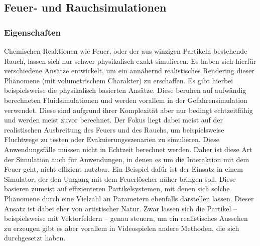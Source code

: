\subsection{Feuer- und Rauchsimulationen}

\subsubsection{Eigenschaften}
Chemischen Reaktionen wie Feuer, oder der aus winzigen Partikeln bestehende Rauch,
lassen sich nur schwer physikalisch exakt simulieren. Es haben sich hierfür verschiedene Ansätze entwickelt, um ein
annähernd realistisches Rendering dieser Phänomene (mit volumetrischem Charakter) zu erschaffen. 
Es gibt hierbei beispielsweise die physikalisch basierten Ansätze. 
Diese beruhen auf aufwändig berechneten Fluidsimulationen und werden vorallem in der Gefahrensimulation verwendet.
Diese sind aufgrund ihrer Komplexität aber nur bedingt echtzeitfähig und werden meist zuvor berechnet. 
Der Fokus liegt dabei meist auf der realistischen Ausbreitung des Feuers und des Rauchs, um beispielsweise Fluchtwege 
zu testen oder Evakuierungsszenarien zu simulieren. Diese Anwendungsfälle müssen nicht in Echtzeit berechnet werden.
Daher ist diese Art der Simulation auch für Anwendungen, in denen es um die Interaktion mit dem Feuer geht, nicht 
effizient nutzbar. Ein Beispiel dafür ist der Einsatz in einem Simulator, der den Umgang mit dem Feuerlöscher
näher bringen soll. Diese basieren zumeist auf effizienteren Partikelsystemen, mit denen sich solche Phänomene 
durch eine Vielzahl an Parametern ebenfalls darstellen lassen. Dieser Ansatz ist dabei eher von artistischer Natur. 
Zwar lassen sich die Partikel – beispielsweise mit Vektorfeldern – genau steuern, um ein realistisches Aussehen zu 
erzeugen gibt es aber vorallem in Videospielen andere Methoden, die sich durchgesetzt haben. 

